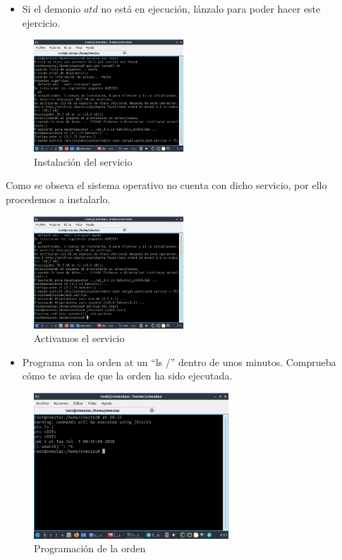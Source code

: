 \documentclass[12pt]{article}
\begin{document}
\begin{itemize}
    \item Si el demonio $atd$ no está en ejecución, lánzalo para poder hacer este
ejercicio.
\end{itemize}

\begin{figure}[h]
    \centering
    \includegraphics[width=0.5\textwidth]{images/screenB09.jpg}
    \caption{Instalación del servicio}
\end{figure}

Como se obseva el sistema operativo no cuenta con dicho servicio, por ello procedemos a instalarlo.

\begin{figure}[h]
    \centering
    \includegraphics[width=0.5\textwidth]{images/screenB10.jpg}
    \caption{Activamos el servicio}
\end{figure}

\clearpage
\newpage

\begin{itemize}
    \item Programa con la orden at un “ls /” dentro de unos minutos.
Comprueba cómo te avisa de que la orden ha sido ejecutada.
\end{itemize}

\begin{figure}[h]
    \centering
    \includegraphics[width=0.65\textwidth]{images/screenB11.jpg}
    \caption{Programación de la orden}
\end{figure}
\end{document}
